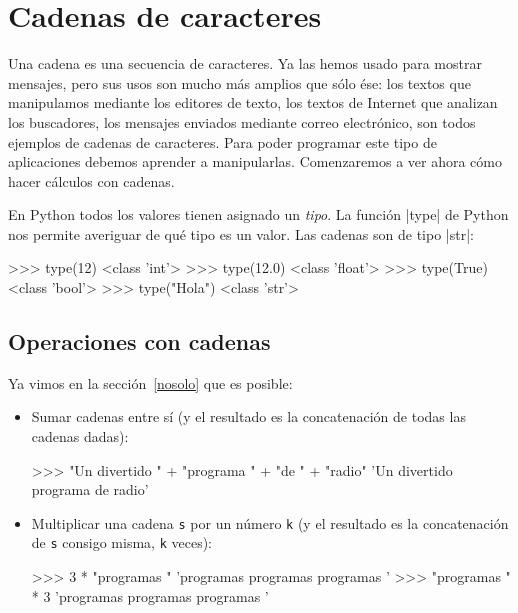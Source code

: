 \chapter{Cadenas de caracteres}

Una cadena es una secuencia de caracteres. Ya las hemos usado para mostrar
mensajes, pero sus usos son mucho más amplios que sólo ése: los textos que
manipulamos mediante los editores de texto, los textos de Internet que
analizan los buscadores, los mensajes enviados mediante correo electrónico,
son todos ejemplos de cadenas de caracteres. Para poder programar este
tipo de aplicaciones debemos aprender a manipularlas. Comenzaremos a ver
ahora cómo hacer cálculos con cadenas.

\begin{sabias_que}
En Python todos los valores tienen asignado un \emph{tipo}. 	La función |type|
de Python nos permite averiguar de qué tipo es un valor. Las cadenas son de
tipo |str|:

\begin{codigo-python-sn}
>>> type(12)
<class 'int'>
>>> type(12.0)
<class 'float'>
>>> type(True)
<class 'bool'>
>>> type("Hola")
<class 'str'>
\end{codigo-python-sn}
\end{sabias_que}

\section{Operaciones con cadenas}

Ya vimos en la sección~\ref{nosolo} que es posible:

\begin{itemize}
\item Sumar cadenas entre sí (y el resultado es la concatenación
de todas las cadenas dadas):

\begin{codigo-python-sn}
>>> "Un divertido " + "programa " + "de " + "radio"
'Un divertido programa de radio'
\end{codigo-python-sn}

\item Multiplicar una cadena \lstinline+s+ por un número \lstinline+k+ (y
el resultado es la concatenación de \lstinline+s+ consigo misma,
\lstinline+k+ veces):

\begin{codigo-python-sn}
>>> 3 * "programas "
'programas programas programas '
>>> "programas " * 3
'programas programas programas '
\end{codigo-python-sn}
\end{itemize}

